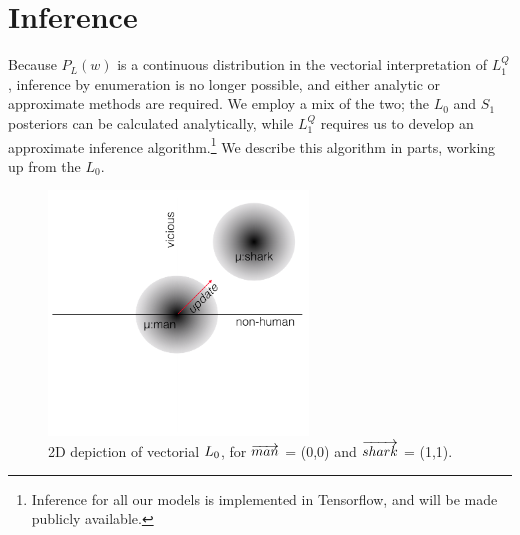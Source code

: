 \documentclass[OpenMind]{stjour}
\newcommand{\Listener}{L}
\newcommand{\QLONE}{\Listener_{{1}}^{{Q}}}
\begin{document}
\section{Inference} \label{technicaloverview}


	Because $P_L(w)$ is a continuous distribution in the vectorial interpretation of $\QLONE$, inference by enumeration is no longer possible, and either analytic or approximate methods are required. We employ a mix of the two; the $L_0$ and $S_1$ posteriors can be calculated analytically, while $\QLONE$ requires us to develop an approximate inference algorithm.\footnote{Inference for all our models is implemented in Tensorflow, and will be made publicly available.} We describe this algorithm in parts, working up from the $L_0$.

	\begin{figure}[htbp]
	\centering
	\includegraphics[height=6.5cm]{images/diagram1.png}
	   
	  \caption{2D depiction of vectorial $L\protect_0$, for $\protect\overrightarrow{man}$ = (0,0) and $\protect\overrightarrow{shark}$ = (1,1).}
	  \label{fig:2d}
	\end{figure}

\end{document}
